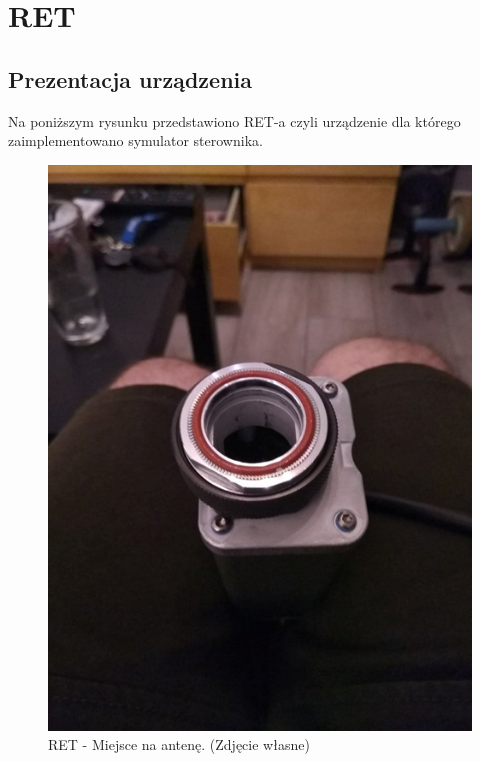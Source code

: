 \chapter{RET}
	\section{Prezentacja urządzenia}
		Na poniższym rysunku przedstawiono RET-a czyli urządzenie dla którego zaimplementowano symulator sterownika.\cite{KATHREIN_RET_1}
		\begin{figure}[h!]
			\centering
			\includegraphics[scale=0.4]{Obrazki/RET_1.png}
			\caption{RET - Miejsce na antenę.
				\newline(Zdjęcie własne)}
		\end{figure}

